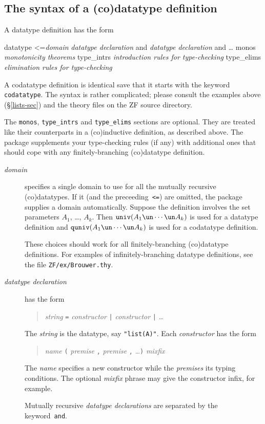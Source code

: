 \subsection{The syntax of a (co)datatype definition}
A datatype definition has the form
\begin{ttbox}
datatype <={\it domain}
 {\it datatype declaration} and {\it datatype declaration} and \ldots
  monos      {\it monotonicity theorems}
  type_intrs {\it introduction rules for type-checking}
  type_elims {\it elimination rules for type-checking}
\end{ttbox}
A codatatype definition is identical save that it starts with the keyword
{\tt codatatype}.  The syntax is rather complicated; please consult the
examples above (\S\ref{lists-sec}) and the theory files on the ZF source
directory.

The {\tt monos}, {\tt type\_intrs} and {\tt type\_elims} sections are
optional.  They are treated like their counterparts in a (co)inductive
definition, as described above.  The package supplements your type-checking
rules (if any) with additional ones that should cope with any
finitely-branching (co)datatype definition.

\begin{description}
\item[\it domain] specifies a single domain to use for all the mutually
  recursive (co)datatypes.  If it (and the preceeding~{\tt <=}) are
  omitted, the package supplies a domain automatically.  Suppose the
  definition involves the set parameters $A_1$, \ldots, $A_k$.  Then
  $\univ(A_1\un\cdots\un A_k)$ is used for a datatype definition and
  $\quniv(A_1\un\cdots\un A_k)$ is used for a codatatype definition.

  These choices should work for all finitely-branching (co)datatype
  definitions.  For examples of infinitely-branching datatype
  definitions, see the file {\tt ZF/ex/Brouwer.thy}.

\item[\it datatype declaration] has the form
\begin{quote}
 {\it string\/} {\tt =} {\it constructor} {\tt|} {\it constructor} {\tt|}
 \ldots 
\end{quote}
The {\it string\/} is the datatype, say {\tt"list(A)"}.  Each
{\it constructor\/} has the form 
\begin{quote}
 {\it name\/} {\tt(} {\it premise} {\tt,} {\it premise} {\tt,} \ldots {\tt)}
 {\it mixfix\/}
\end{quote}
The {\it name\/} specifies a new constructor while the {\it premises\/} its
typing conditions.  The optional {\it mixfix\/} phrase may give
the constructor infix, for example.

Mutually recursive {\it datatype declarations\/} are separated by the
keyword~{\tt and}.
\end{description}

